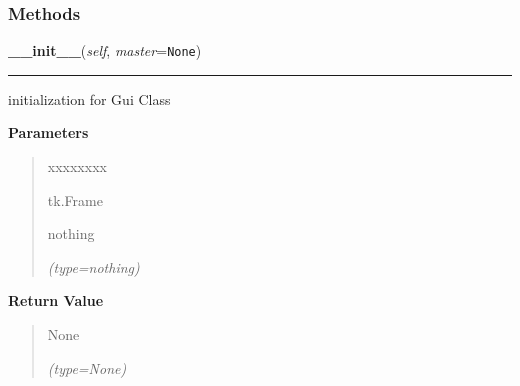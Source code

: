 
  \subsubsection{Methods}

    \label{client_gui:GuiClass:__init__}

    \vspace{0.5ex}

\hspace{.8\funcindent}\begin{boxedminipage}{\funcwidth}

    \raggedright \textbf{\_\_init\_\_}(\textit{self}, \textit{master}={\tt None})

    \vspace{-1.5ex}

    \rule{\textwidth}{0.5\fboxrule}
\setlength{\parskip}{2ex}
    initialization for Gui Class

\setlength{\parskip}{1ex}
      \textbf{Parameters}
      \vspace{-1ex}

      \begin{quote}
        \begin{Ventry}{xxxxxxxx}

          \item[tk.Frame]

          nothing

            {\it (type=nothing)}

        \end{Ventry}

      \end{quote}

      \textbf{Return Value}
    \vspace{-1ex}

      \begin{quote}
      None

      {\it (type=None)}

      \end{quote}

    \end{boxedminipage}

